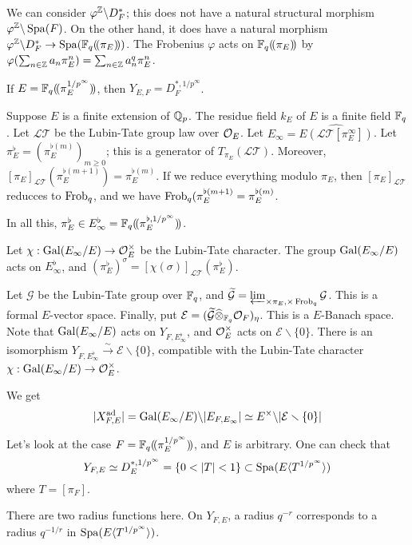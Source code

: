 We can consider $\varphi^{\mathbb{Z}}\backslash D_F^\ast$; this does not have a natural 
structural morphism $\varphi^{\mathbb{Z}}\backslash \operatorname{Spa}(F)$. On the other hand, it does 
have a natural morphism $\varphi^{\mathbb{Z}}\backslash D_F^\ast \to \operatorname{Spa}(\mathbb{F}_q(\!( {\pi_E} )\!))$. 
The Frobenius $\varphi$ acts on $\mathbb{F}_q(\!( {\pi_E} )\!)$ by 
$\varphi(\sum_{n\in \mathbb{Z}} a_n \pi_E^n) = \sum_{n\in \mathbb{Z}} a_n^q \pi_E^n$. 

If $E=\mathbb{F}_q(\!( {\pi_E^{1/p^\infty}} )\!)$, then $Y_{E,F} = D_F^{\ast,1/p^\infty}$. 

\begin{example}
Suppose $E$ is a finite extension of $\mathbb{Q}_p$. The residue field $k_E$ of $E$ is 
a finite field $\mathbb{F}_q$. Let $\mathcal{LT}$ be the Lubin-Tate group law 
over $\mathcal{O}_E$. Let $E_\infty=\widehat{E(\mathcal{LT}[\pi_E^\infty])}$. Let 
$\pi_E^\flat=(\pi_E^{\flat(m)})_{m\geqslant 0}$; this is a generator of 
$T_{\pi_E}(\mathcal{LT})$. Moreover, 
$[\pi_E]_{\mathcal{LT}}(\pi_E^{\flat (m+1)}) = \pi_E^{\flat(m)}$. If we 
reduce everything modulo $\pi_E$, then $[\pi_E]_{\mathcal{LT}}$ reducces to 
$\operatorname{Frob}_q$, and we have $\operatorname{Frob}_q(\pi_E^{\flat(m+1)} = \pi_E^{\flat(m)}$. 

In all this, $\pi_E^\flat\in E_\infty^\flat = \mathbb{F}_q(\!( {\pi_E^{\flat,1/p^\infty}} )\!)$. 

Let $\chi:\operatorname{Gal}(E_\infty/E) \to \mathcal{O}_E^\times$ be the Lubin-Tate character. 
The group $\operatorname{Gal}(E_\infty/E)$ acts on $E_\infty^\flat$, and 
$(\pi_E^\flat)^\sigma  = [\chi(\sigma)]_{\mathcal{LT}}(\pi_E^\flat)$. 

Let $\mathcal G$ be the Lubin-Tate group over $\mathbb{F}_q$, and 
$\widetilde{\mathcal G}=\varprojlim_{\times \pi_E,\times \operatorname{Frob}_q} \mathcal G$. This 
is a formal $E$-vector space. Finally, put 
$\mathcal E=(\widetilde{\mathcal G}\widehat\otimes_{\mathbb{F}_q} \mathcal{O}_F)_\eta$. This is a 
$E$-Banach space. Note that $\operatorname{Gal}(E_\infty/E)$ acts on 
$Y_{F,E_\infty^\flat}$, and 
$\mathcal{O}_E^\times$ acts on $\mathcal E\smallsetminus \{0\}$. There is an isomorphism 
$Y_{F,E_\infty^\flat} \xrightarrow\sim \mathcal E\smallsetminus \{0\}$, compatible 
with the Lubin-Tate character $\chi:\operatorname{Gal}(E_\infty/E) \to \mathcal{O}_E^\times$. 

We get 
\[
  |X_{F,E}^{\textnormal{ad}}| = \operatorname{Gal}(E_\infty/E) \backslash |E_{F,E_\infty}| \simeq E^\times \backslash |\mathcal E\smallsetminus \{0\}|
\]
\end{example}

\begin{example}
Let's look at the case $F=\mathbb{F}_q(\!( {\pi_E^{1/p^\infty}} )\!)$, and $E$ is arbitrary. 
One can check that 
\[
  Y_{F,E}\simeq D_E^{\ast,1/p^\infty} = \{0<|T|<1\}\subset \spa(E\langle T^{1/p^\infty}\rangle)
\]
where $T=[\pi_F]$. 

There are two radius functions here. On $Y_{F,E}$, a radius 
$q^{-r}$ corresponds to a radius $q^{-1/r}$ in $\operatorname{Spa}(E\langle T^{1/p^\infty}\rangle)$. 
\end{example}


